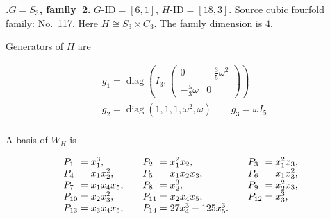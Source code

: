 \documentclass[12pt]{amsart}
\makeatletter
\numberwithin{equation}{section}
\theoremstyle{plain}
\theoremstyle{definition}
\theoremstyle{remark}
\DeclareMathOperator{\diag}{diag}
\newcommand{\PBasisLabel}[1]{\mathrlap{P_{#1}}\phantom{P_{99}}}
\newenvironment{SecEightAlignedBasis}[1]{%
  \begingroup\renewcommand{\arraystretch}{1.18}%
  \[\begin{array}{@{}#1@{}}%
}{\end{array}\]\endgroup}
\newenvironment{familydisplay}{%
  \begingroup
  \setlength{\arraycolsep}{1.35pt}%
  \renewcommand{\arraystretch}{0.96}%
  \setlength{\jot}{2pt}%
}{\endgroup}
\newcommand{\smat}[1]{\left(\begin{smallmatrix}#1\end{smallmatrix}\right)}
\makeatother
\begin{document}
\par{}\medskip\noindent\textbf{.\enspace $G=S_3$, family~2.}\label{fam:threefold-no-30}
$G\text{-ID}=[6,1]$, $H\text{-ID}=[18,3]$.
Source cubic fourfold family: No.~117.  Here
$H\cong S_3\times C_3$.
The family dimension is $4$.
\par\smallskip\noindent Generators of $H$ are\par\nopagebreak
\begin{familydisplay}
\begin{align*}
&g_{1}=\diag\!\left(I_3,\smat{0&-\tfrac35\omega^2\\-\tfrac53\omega&0}\right)\\
&g_{2}=\diag(1,1,1,\omega^2,\omega)\qquad g_{3}=\omega I_5\\
\end{align*}
\end{familydisplay}
\par\smallskip\noindent A basis of $W_H$ is\par\nopagebreak
\begin{familydisplay}
\begin{SecEightAlignedBasis}{l@{\qquad}l@{\qquad}l}
\PBasisLabel{1}=x_{1}^{3}, & \PBasisLabel{2}=x_{1}^{2}x_{2}, & \PBasisLabel{3}=x_{1}^{2}x_{3},\\
\PBasisLabel{4}=x_{1}x_{2}^{2}, & \PBasisLabel{5}=x_{1}x_{2}x_{3}, & \PBasisLabel{6}=x_{1}x_{3}^{2},\\
\PBasisLabel{7}=x_{1}x_{4}x_{5}, & \PBasisLabel{8}=x_{2}^{3}, & \PBasisLabel{9}=x_{2}^{2}x_{3},\\
\PBasisLabel{10}=x_{2}x_{3}^{2}, & \PBasisLabel{11}=x_{2}x_{4}x_{5}, & \PBasisLabel{12}=x_{3}^{3},\\
\PBasisLabel{13}=x_{3}x_{4}x_{5}, & \PBasisLabel{14}=27x_{4}^{3}-125x_{5}^{3}.
\end{SecEightAlignedBasis}
\end{familydisplay}
\end{document}
